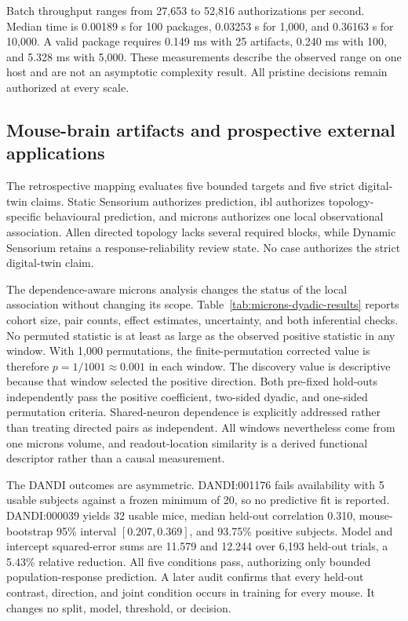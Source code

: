 Batch throughput ranges from 27,653 to 52,816 authorizations per second. Median time is 0.00189 s for 100 packages, 0.03253 s for 1,000, and 0.36163 s for 10,000. A valid package requires 0.149 ms with 25 artifacts, 0.240 ms with 100, and 5.328 ms with 5,000. These measurements describe the observed range on one host and are not an asymptotic complexity result. All pristine decisions remain authorized at every scale.





\FloatBarrier

\subsection{Mouse-brain artifacts and prospective external applications}
\label{subsec:application-results}

The retrospective mapping evaluates five bounded targets and five strict digital-twin claims. Static Sensorium authorizes prediction, \ac{ibl} authorizes topology-specific behavioural prediction, and \ac{microns} authorizes one local observational association. Allen directed topology lacks several required blocks, while Dynamic Sensorium retains a response-reliability review state. No case authorizes the strict digital-twin claim.

The dependence-aware \ac{microns} analysis changes the status of the local association without changing its scope. Table~\ref{tab:microns-dyadic-results} reports cohort size, pair counts, effect estimates, uncertainty, and both inferential checks. No permuted statistic is at least as large as the observed positive statistic in any window. With 1,000 permutations, the finite-permutation corrected value is therefore $p=1/1001\approx0.001$ in each window. The discovery value is descriptive because that window selected the positive direction. Both pre-fixed hold-outs independently pass the positive coefficient, two-sided dyadic, and one-sided permutation criteria. Shared-neuron dependence is explicitly addressed rather than treating directed pairs as independent. All windows nevertheless come from one \ac{microns} volume, and readout-location similarity is a derived functional descriptor rather than a causal measurement.



The DANDI outcomes are asymmetric. DANDI:001176 fails availability with 5 usable subjects against a frozen minimum of 20, so no predictive fit is reported. DANDI:000039 yields 32 usable mice, median held-out correlation 0.310, mouse-bootstrap 95\% interval $[0.207,0.369]$, and 93.75\% positive subjects. Model and intercept squared-error sums are 11.579 and 12.244 over 6,193 held-out trials, a 5.43\% relative reduction. All five conditions pass, authorizing only bounded population-response prediction. A later audit confirms that every held-out contrast, direction, and joint condition occurs in training for every mouse. It changes no split, model, threshold, or decision.

